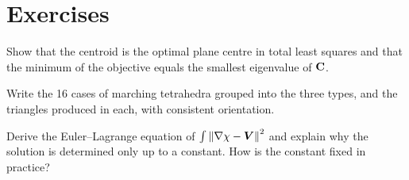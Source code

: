 \section*{Exercises}
\begin{exercise}
Show that the centroid is the optimal plane centre in total least squares and that the minimum of
the objective equals the smallest eigenvalue of $\mathbf{C}$.
\end{exercise}
\begin{exercise}
Write the 16 cases of marching tetrahedra grouped into the three types, and the triangles produced
in each, with consistent orientation.
\end{exercise}
\begin{exercise}
Derive the Euler--Lagrange equation of $\int\left\lVert \nabla\chi-\bm V\right\rVert^2$ and explain why the solution is
determined only up to a constant. How is the constant fixed in practice?
\end{exercise}
